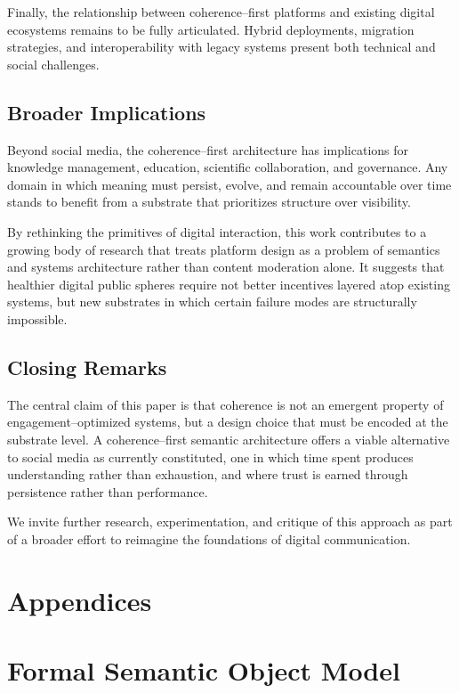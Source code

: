 \documentclass[11pt]{article}
\begin{document}
Finally, the relationship between coherence--first platforms and existing digital
ecosystems remains to be fully articulated. Hybrid deployments, migration strategies, and
interoperability with legacy systems present both technical and social challenges.

\subsection{Broader Implications}

Beyond social media, the coherence--first architecture has implications for knowledge
management, education, scientific collaboration, and governance. Any domain in which
meaning must persist, evolve, and remain accountable over time stands to benefit from a
substrate that prioritizes structure over visibility.

By rethinking the primitives of digital interaction, this work contributes to a growing
body of research that treats platform design as a problem of semantics and systems
architecture rather than content moderation alone. It suggests that healthier digital
public spheres require not better incentives layered atop existing systems, but new
substrates in which certain failure modes are structurally impossible.

\subsection{Closing Remarks}

The central claim of this paper is that coherence is not an emergent property of
engagement--optimized systems, but a design choice that must be encoded at the substrate
level. A coherence--first semantic architecture offers a viable alternative to social
media as currently constituted, one in which time spent produces understanding rather than
exhaustion, and where trust is earned through persistence rather than performance.

We invite further research, experimentation, and critique of this approach as part of a
broader effort to reimagine the foundations of digital communication.

\newpage

\section*{Appendices} 

\appendix
\section{Formal Semantic Object Model}
\end{document}
